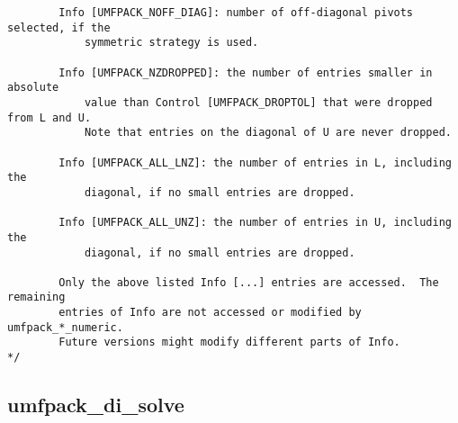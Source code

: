 \documentclass[11pt]{article}
\begin{document}
{\begin{verbatim}
        Info [UMFPACK_NOFF_DIAG]: number of off-diagonal pivots selected, if the
            symmetric strategy is used.

        Info [UMFPACK_NZDROPPED]: the number of entries smaller in absolute
            value than Control [UMFPACK_DROPTOL] that were dropped from L and U.
            Note that entries on the diagonal of U are never dropped.

        Info [UMFPACK_ALL_LNZ]: the number of entries in L, including the
            diagonal, if no small entries are dropped.

        Info [UMFPACK_ALL_UNZ]: the number of entries in U, including the
            diagonal, if no small entries are dropped.

        Only the above listed Info [...] entries are accessed.  The remaining
        entries of Info are not accessed or modified by umfpack_*_numeric.
        Future versions might modify different parts of Info.
*/

\end{verbatim}
}

\newpage
\subsection{umfpack\_di\_solve}
\end{document}
